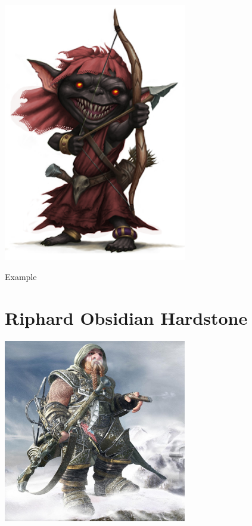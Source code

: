 \documentclass[letterpaper,10pt,twoside,twocolumn,openany]{book}
\begin{document}
\begin{center}
\includegraphics[width=80mm]{./img/exme1.png}
\begin{figure}[h]
\end{figure}
\end{center}

\begin{paperbox}{Example}
  \lipsum[2]
\end{paperbox}

\clearpage


\section{Riphard Obsidian Hardstone}

\begin{center}
\includegraphics[width=80mm]{./img/riphard1.jpg}
\begin{figure}[h]
\end{figure}
\end{center}
\end{document}
